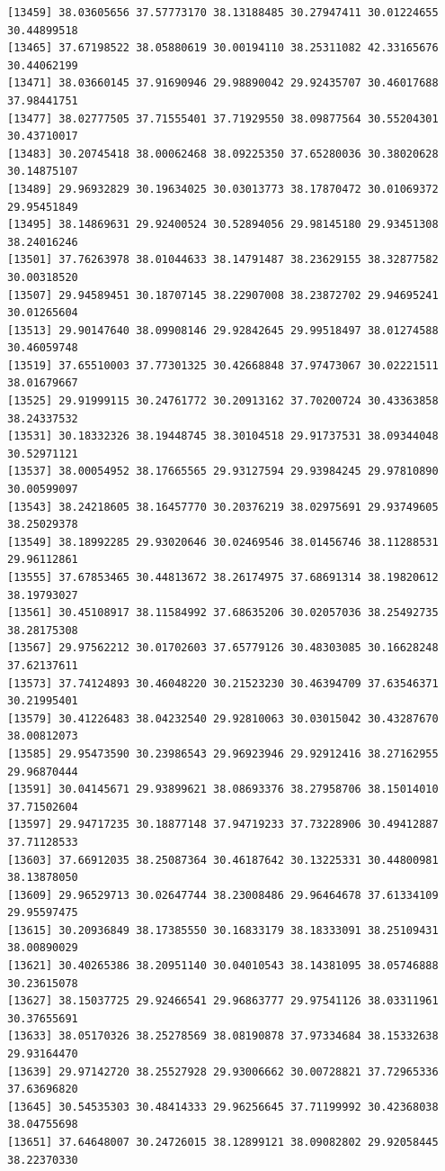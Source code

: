 \documentclass[
  letterpaper,
  DIV=11,
  numbers=noendperiod]{scrartcl}
\begin{document}
\begin{verbatim}
[13459] 38.03605656 37.57773170 38.13188485 30.27947411 30.01224655 30.44899518
[13465] 37.67198522 38.05880619 30.00194110 38.25311082 42.33165676 30.44062199
[13471] 38.03660145 37.91690946 29.98890042 29.92435707 30.46017688 37.98441751
[13477] 38.02777505 37.71555401 37.71929550 38.09877564 30.55204301 30.43710017
[13483] 30.20745418 38.00062468 38.09225350 37.65280036 30.38020628 30.14875107
[13489] 29.96932829 30.19634025 30.03013773 38.17870472 30.01069372 29.95451849
[13495] 38.14869631 29.92400524 30.52894056 29.98145180 29.93451308 38.24016246
[13501] 37.76263978 38.01044633 38.14791487 38.23629155 38.32877582 30.00318520
[13507] 29.94589451 30.18707145 38.22907008 38.23872702 29.94695241 30.01265604
[13513] 29.90147640 38.09908146 29.92842645 29.99518497 38.01274588 30.46059748
[13519] 37.65510003 37.77301325 30.42668848 37.97473067 30.02221511 38.01679667
[13525] 29.91999115 30.24761772 30.20913162 37.70200724 30.43363858 38.24337532
[13531] 30.18332326 38.19448745 38.30104518 29.91737531 38.09344048 30.52971121
[13537] 38.00054952 38.17665565 29.93127594 29.93984245 29.97810890 30.00599097
[13543] 38.24218605 38.16457770 30.20376219 38.02975691 29.93749605 38.25029378
[13549] 38.18992285 29.93020646 30.02469546 38.01456746 38.11288531 29.96112861
[13555] 37.67853465 30.44813672 38.26174975 37.68691314 38.19820612 38.19793027
[13561] 30.45108917 38.11584992 37.68635206 30.02057036 38.25492735 38.28175308
[13567] 29.97562212 30.01702603 37.65779126 30.48303085 30.16628248 37.62137611
[13573] 37.74124893 30.46048220 30.21523230 30.46394709 37.63546371 30.21995401
[13579] 30.41226483 38.04232540 29.92810063 30.03015042 30.43287670 38.00812073
[13585] 29.95473590 30.23986543 29.96923946 29.92912416 38.27162955 29.96870444
[13591] 30.04145671 29.93899621 38.08693376 38.27958706 38.15014010 37.71502604
[13597] 29.94717235 30.18877148 37.94719233 37.73228906 30.49412887 37.71128533
[13603] 37.66912035 38.25087364 30.46187642 30.13225331 30.44800981 38.13878050
[13609] 29.96529713 30.02647744 38.23008486 29.96464678 37.61334109 29.95597475
[13615] 30.20936849 38.17385550 30.16833179 38.18333091 38.25109431 38.00890029
[13621] 30.40265386 38.20951140 30.04010543 38.14381095 38.05746888 30.23615078
[13627] 38.15037725 29.92466541 29.96863777 29.97541126 38.03311961 30.37655691
[13633] 38.05170326 38.25278569 38.08190878 37.97334684 38.15332638 29.93164470
[13639] 29.97142720 38.25527928 29.93006662 30.00728821 37.72965336 37.63696820
[13645] 30.54535303 30.48414333 29.96256645 37.71199992 30.42368038 38.04755698
[13651] 37.64648007 30.24726015 38.12899121 38.09082802 29.92058445 38.22370330

\end{verbatim}
\end{document}
